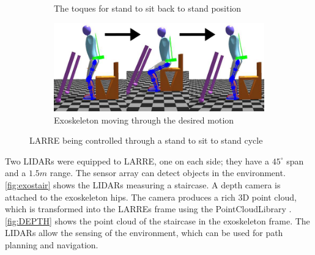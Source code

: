 \begin{figure}[h!]
\begin{subfigure}{0.5\textwidth}
        \caption{The toques for stand to sit back to stand position }
    \label{fig:simsit2standtorque}
\end{subfigure}
    \begin{subfigure}{0.5\textwidth}
        \centering
        \includegraphics[scale=.5]{images/sim/sit_to_stand2 (1).png}
        \caption{Exoskeleton moving through the desired motion}
    \label{fig:sit2stand}
\end{subfigure}
    \caption[LARRE Simulation standing to sit motion]{LARRE being controlled through a stand to sit to stand cycle}
    \label{fig:simwalking}
\end{figure}
 
 
 
 Two LIDARs were equipped to LARRE, one on each side; they have a $45^{\circ}$ span and a $1.5m$ range. The sensor array can detect objects in the environment. \autoref{fig:exostair} shows the LIDARs measuring a staircase. A depth camera is attached to the exoskeleton hips. The camera produces a rich 3D point cloud, which is transformed into the LARREs frame using the PointCloudLibrary \cite{Rusu_ICRA2011_PCL}.  \autoref{fig:DEPTH} shows the point cloud of the staircase in the exoskeleton frame. The LIDARs allow the sensing of the environment, which can be used for path planning and navigation. 

